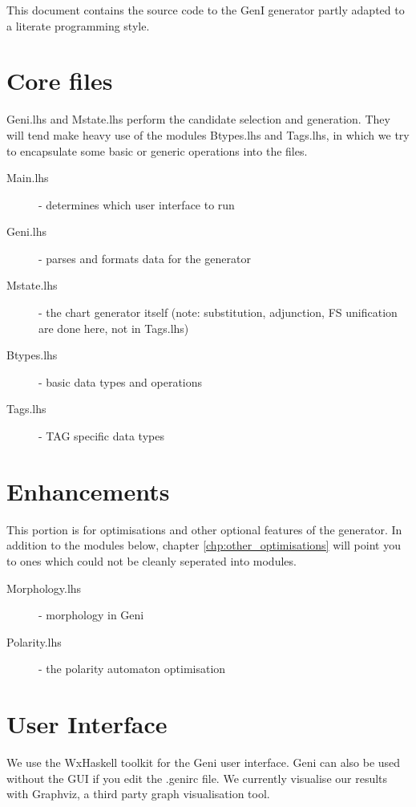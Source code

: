 \documentclass[a4paper,11pt]{report}
\begin{document}
This document contains the source code to the GenI generator 
partly adapted to a literate programming style.  

\section{Core files}

Geni.lhs and Mstate.lhs perform the candidate selection and generation.
They will tend make heavy use of the modules Btypes.lhs and Tags.lhs, in
which we try to encapsulate some basic or generic operations into the
files.

\begin{description}
 \item[Main.lhs] - determines which user interface to run 
 \item[Geni.lhs] - parses and formats data for the generator 
 \item[Mstate.lhs] - the chart generator itself (note: substitution,
 adjunction, FS unification are done here, not in Tags.lhs)
 \item[Btypes.lhs] - basic data types and operations
 \item[Tags.lhs] - TAG specific data types
\end{description}

\section{Enhancements}

This portion is for optimisations and other optional features of the
generator.
In addition to the modules below, chapter \ref{chp:other_optimisations}
will point you to ones which could not be cleanly seperated into
modules.

\begin{description}
 \item[Morphology.lhs] - morphology in Geni  
 \item[Polarity.lhs]   - the polarity automaton optimisation 
\end{description}

\section{User Interface}

We use the WxHaskell toolkit for the Geni user interface.  Geni
can also be used without the GUI if you edit the .genirc file.
We currently visualise our results with Graphviz, a third party graph
visualisation tool.
\end{document}

